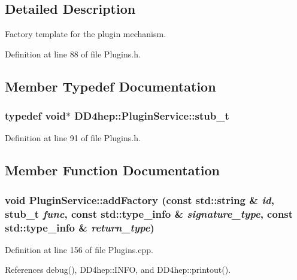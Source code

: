 \subsection{Detailed Description}
Factory template for the plugin mechanism. 

Definition at line 88 of file Plugins.h.

\subsection{Member Typedef Documentation}
\hypertarget{class_d_d4hep_1_1_plugin_service_aa370cd45b770eaabf326eeaa91019382}{
\subsubsection[{stub\_\-t}]{\setlength{\rightskip}{0pt plus 5cm}typedef void$\ast$ {\bf DD4hep::PluginService::stub\_\-t}}}
\label{class_d_d4hep_1_1_plugin_service_aa370cd45b770eaabf326eeaa91019382}


Definition at line 91 of file Plugins.h.

\subsection{Member Function Documentation}
\hypertarget{class_d_d4hep_1_1_plugin_service_a55973b500e0191d1e843b7db9cfd37eb}{
\subsubsection[{addFactory}]{\setlength{\rightskip}{0pt plus 5cm}void PluginService::addFactory (const std::string \& {\em id}, \/  {\bf stub\_\-t} {\em func}, \/  const std::type\_\-info \& {\em signature\_\-type}, \/  const std::type\_\-info \& {\em return\_\-type})}}
\label{class_d_d4hep_1_1_plugin_service_a55973b500e0191d1e843b7db9cfd37eb}


Definition at line 156 of file Plugins.cpp.

References debug(), DD4hep::INFO, and DD4hep::printout().

